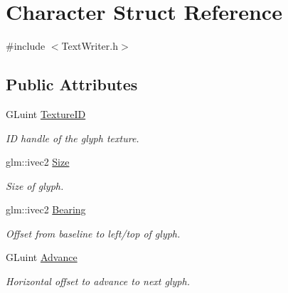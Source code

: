 \hypertarget{struct_character}{\section{Character Struct Reference}
\label{struct_character}
}


{\ttfamily \#include $<$Text\+Writer.\+h$>$}

\subsection*{Public Attributes}
\begin{DoxyCompactItemize}
\item 
\hypertarget{struct_character_a51d894cc31d79e95fe1a47fb65c6e889}{G\+Luint \hyperlink{struct_character_a51d894cc31d79e95fe1a47fb65c6e889}{Texture\+I\+D}}\label{struct_character_a51d894cc31d79e95fe1a47fb65c6e889}

\begin{DoxyCompactList}\small\item\em I\+D handle of the glyph texture. \end{DoxyCompactList}\item 
\hypertarget{struct_character_aaaa598050e0ef590fe6903fd2bab40b8}{glm\+::ivec2 \hyperlink{struct_character_aaaa598050e0ef590fe6903fd2bab40b8}{Size}}\label{struct_character_aaaa598050e0ef590fe6903fd2bab40b8}

\begin{DoxyCompactList}\small\item\em Size of glyph. \end{DoxyCompactList}\item 
\hypertarget{struct_character_afef98bf9c7f5313d96476f6f3f85f872}{glm\+::ivec2 \hyperlink{struct_character_afef98bf9c7f5313d96476f6f3f85f872}{Bearing}}\label{struct_character_afef98bf9c7f5313d96476f6f3f85f872}

\begin{DoxyCompactList}\small\item\em Offset from baseline to left/top of glyph. \end{DoxyCompactList}\item 
\hypertarget{struct_character_ab35bae8be6740729fc5839c237a659f6}{G\+Luint \hyperlink{struct_character_ab35bae8be6740729fc5839c237a659f6}{Advance}}\label{struct_character_ab35bae8be6740729fc5839c237a659f6}

\begin{DoxyCompactList}\small\item\em Horizontal offset to advance to next glyph. \end{DoxyCompactList}\end{DoxyCompactItemize}


